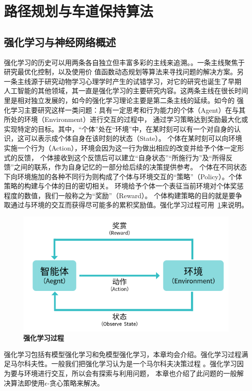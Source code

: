 \section{路径规划与车道保持算法}

\subsection{强化学习与神经网络概述}
强化学习的历史可以用两条各自独立但丰富多彩的主线来追溯。。一条主线聚焦于研究最优化控制，以及使用价
值函数动态规划等算法来寻找问题的解决方案。另一条主线源于研究动物学习心理学时产生的试错学习，对它的研究也诞生了早期 人工智能的其他领域，其一直是强化学习的主要研究内容。这两条主线在很长时间里是相对独立发展的，如今的强化学习理论主要是第二条主线的延续。如今的
强化学习主要研究这样一类问题：具有一定思考和行为能力的个体（Agent）在与其所处的环境（Environment）进行交互的过程中，
通过学习策略达到奖励最大化或实现特定的目标。其中，“个体”处在“环境”中，在某时刻可以有一个对自身的认识，这可以表示成个体自身在该时刻的状态（State）。
个体在某时刻可以向环境实施一个行为（Action），环境会因为这一行为做出相应的改变并给予个体一定形式的反馈，
个体接收到这个反馈后可以建立“自身状态”“所施行为”及“所得反馈”之间的联系，作为自身记忆的一部分给后续的决策提供参考。
个体在不同状态下向环境施加的各种不同行为则构成了个体与环境交互的“策略”（Policy）。个体策略的构建与个体的目的密切相关。
环境给予个体一个表征当前环境对个体奖惩程度的数值，我们一般称之为“奖励”（Reward）。
个体构建策略的目的就是要争取通过与环境的交互而获得尽可能多的累积奖励值。强化学习过程可用~\ref{fig:3_1}来说明。
\begin{figure}[H]
  \centering
  \includegraphics[width=0.5\linewidth]{fig/rl.png}
  \caption{\textbf{强化学习过程}}
  \label{fig:3_1}
\end{figure}

强化学习包括有模型强化学习和免模型强化学习，本章均会介绍。强化学习过程满足马尔科夫性。一般我们把强化学习认为是一个马尔科夫决策过程 。强化学习因为要与环境进行交互，所以会有探索与利用问题，
本章也介绍了此问题的一般解决算法即使用$\epsilon$-贪心策略来解决。
